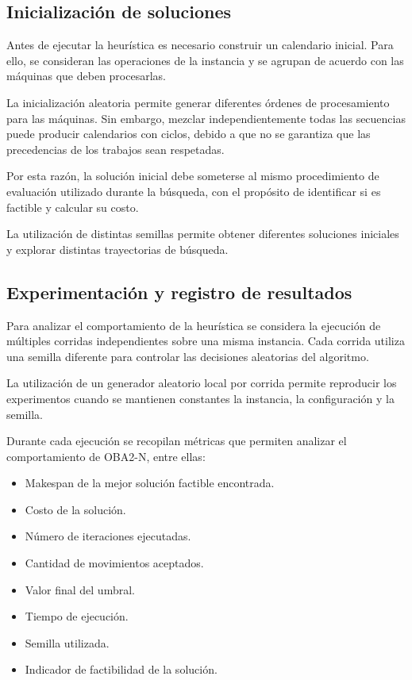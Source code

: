 \documentclass[12pt,a4paper]{article}
\begin{document}
\subsection{Inicialización de soluciones}

Antes de ejecutar la heurística es necesario construir un calendario inicial. Para ello, se consideran las operaciones de la instancia y se agrupan de acuerdo con las máquinas que deben procesarlas.

La inicialización aleatoria permite generar diferentes órdenes de procesamiento para las máquinas. Sin embargo, mezclar independientemente todas las secuencias puede producir calendarios con ciclos, debido a que no se garantiza que las precedencias de los trabajos sean respetadas.

Por esta razón, la solución inicial debe someterse al mismo procedimiento de evaluación utilizado durante la búsqueda, con el propósito de identificar si es factible y calcular su costo.

La utilización de distintas semillas permite obtener diferentes soluciones iniciales y explorar distintas trayectorias de búsqueda.

\subsection{Experimentación y registro de resultados}

Para analizar el comportamiento de la heurística se considera la ejecución de múltiples corridas independientes sobre una misma instancia. Cada corrida utiliza una semilla diferente para controlar las decisiones aleatorias del algoritmo.

La utilización de un generador aleatorio local por corrida permite reproducir los experimentos cuando se mantienen constantes la instancia, la configuración y la semilla.

Durante cada ejecución se recopilan métricas que permiten analizar el comportamiento de OBA2-N, entre ellas:

\begin{itemize}
    \item Makespan de la mejor solución factible encontrada.
    \item Costo de la solución.
    \item Número de iteraciones ejecutadas.
    \item Cantidad de movimientos aceptados.
    \item Valor final del umbral.
    \item Tiempo de ejecución.
    \item Semilla utilizada.
    \item Indicador de factibilidad de la solución.
\end{itemize}
\end{document}
